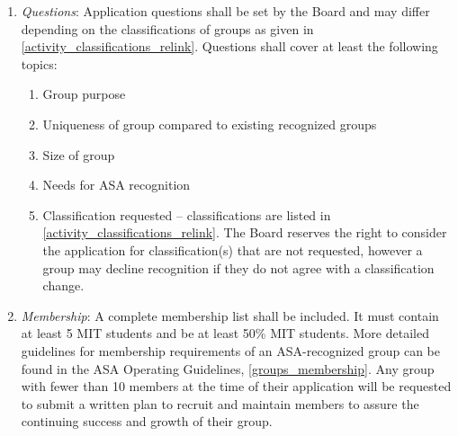 \documentclass[12pt]{constitution}
\begin{document}
\begin{enumerate}
    \item \textit{Questions}: Application questions shall be set by the Board and may differ depending on the
        classifications of groups as given in \ref{activity_classifications_relink}.
    Questions shall cover at least the following topics:
    \begin{enumerate}
        \item Group purpose
        \item Uniqueness of group compared to existing recognized groups
        \item Size of group
        \item Needs for ASA recognition
        \item Classification requested -- classifications are listed in \ref{activity_classifications_relink}.
        The Board reserves the right to consider the application for classification(s) that are not requested,
            however a group may decline recognition if they do not agree with a classification change.
    \end{enumerate}

    \item \textit{Membership}: A complete membership list shall be included.
    It must contain at least 5 MIT students and be at least 50\% MIT students.
    More detailed guidelines for membership requirements of an ASA-recognized group can be found in the
        ASA Operating Guidelines, \ref{groups_membership}.
    Any group with fewer than 10 members at the time of their application will be
        requested to submit a written plan to recruit and maintain members to assure the continuing
        success and growth of their group.


\end{enumerate}
\end{document}
